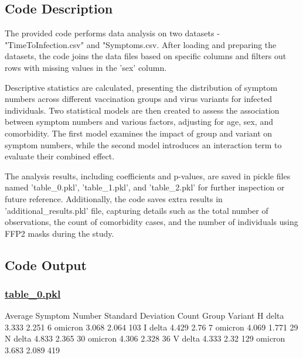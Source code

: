 \documentclass[11pt]{article}
\begin{document}
\subsection{Code Description}

The provided code performs data analysis on two datasets - "TimeToInfection.csv" and "Symptoms.csv. After loading and preparing the datasets, the code joins the data files based on specific columns and filters out rows with missing values in the 'sex' column. 

Descriptive statistics are calculated, presenting the distribution of symptom numbers across different vaccination groups and virus variants for infected individuals. Two statistical models are then created to assess the association between symptom numbers and various factors, adjusting for age, sex, and comorbidity. The first model examines the impact of group and variant on symptom numbers, while the second model introduces an interaction term to evaluate their combined effect.

The analysis results, including coefficients and p-values, are saved in pickle files named 'table\_0.pkl', 'table\_1.pkl', and 'table\_2.pkl' for further inspection or future reference. Additionally, the code saves extra results in 'additional\_results.pkl' file, capturing details such as the total number of observations, the count of comorbidity cases, and the number of individuals using FFP2 masks during the study.

\subsection{Code Output}\hypertarget{file-table-0-pkl}{}

\subsubsection*{\hyperlink{code-Data Analysis-table-0-pkl}{table\_0.pkl}}

\begin{codeoutput}
               Average Symptom Number  Standard Deviation  Count
Group Variant                                                   
H     delta                     3.333               2.251      6
      omicron                   3.068               2.064    103
I     delta                     4.429                2.76      7
      omicron                   4.069               1.771     29
N     delta                     4.833               2.365     30
      omicron                   4.306               2.328     36
V     delta                     4.333                2.32    129
      omicron                   3.683               2.089    419
\end{codeoutput}\hypertarget{file-table-1-pkl}{}
\end{document}
